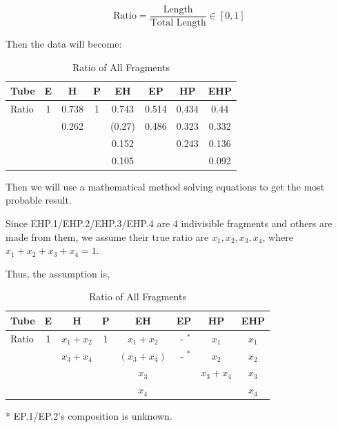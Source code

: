 \documentclass{article}
\begin{document}
            $$\text{Ratio} = \frac{\text{Length}}{\text{Total Length}} \in [0, 1]$$

            Then the data will become:
            \begin{table}[H]
                \caption{Ratio of All Fragments}
                \centering
                \begin{tabular}{|l|c|c|c|c|c|c|c|}
                    \hline
                    Tube&E&H&P&EH&EP&HP&EHP\\
                    \hline
                    Ratio&1&0.738&1&0.743&0.514&0.434&0.44\\
                    &&0.262&&(0.27)&0.486&0.323&0.332\\
                    &&&&0.152&&0.243&0.136\\
                    &&&&0.105&&&0.092\\
                    \hline
                \end{tabular}
                \label{data.ratio}
            \end{table}

            Then we will use a mathematical method solving equations to get the most probable result.

            Since EHP.1/EHP.2/EHP.3/EHP.4 are 4 indivisible fragments and others are made from them, we assume their true ratio are $x_1, x_2, x_3, x_4$, where $x_1 + x_2 + x_3 + x_4 = 1$.

            Thus, the assumption is,
            \begin{table}[H]
                \caption{Ratio of All Fragments}
                \centering
                \begin{threeparttable}
                    \begin{tabular}{|l|c|c|c|c|c|c|c|}
                        \hline
                        Tube&E&H&P&EH&EP&HP&EHP\\
                        \hline
                        Ratio&1&$x_1 + x_2$&1&$x_1 + x_2$&$\text{ - }^*$&$x_1$&$x_1$\\
                        &&$x_3 + x_4$&&$(x_3 + x_4)$&$\text{ - }^*$&$x_2$&$x_2$\\
                        &&&&$x_3$&&$x_3 + x_4$&$x_3$\\
                        &&&&$x_4$&&&$x_4$\\
                        \hline
                    \end{tabular}
                    \begin{tablenotes}
                            \footnotesize
                            \item[*] EP.1/EP.2's composition is unknown.
                        \end{tablenotes}
                \end{threeparttable}
                \label{data.ratio.x}
            \end{table}
\end{document}
